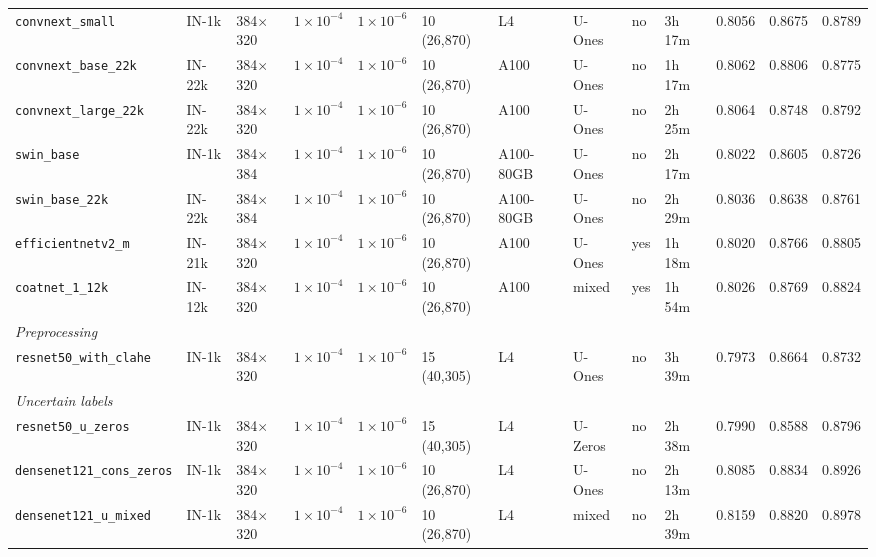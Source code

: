\begin{landscape}
\begin{longtable}{llllllllllrrr}
    \texttt{\scriptsize convnext\_small} & IN-1k & 384$\times$320 & $1\times10^{-4}$ & $1\times10^{-6}$ & 10 (26,870) & L4 & U-Ones & no & 3h\,17m & 0.8056 & 0.8675 & 0.8789 \\
    \texttt{\scriptsize convnext\_base\_22k} & IN-22k & 384$\times$320 & $1\times10^{-4}$ & $1\times10^{-6}$ & 10 (26,870) & A100 & U-Ones & no & 1h\,17m & 0.8062 & 0.8806 & 0.8775 \\
    \texttt{\scriptsize convnext\_large\_22k} & IN-22k & 384$\times$320 & $1\times10^{-4}$ & $1\times10^{-6}$ & 10 (26,870) & A100 & U-Ones & no & 2h\,25m & 0.8064 & 0.8748 & 0.8792 \\
    \texttt{\scriptsize swin\_base} & IN-1k & 384$\times$384 & $1\times10^{-4}$ & $1\times10^{-6}$ & 10 (26,870) & A100-80GB & U-Ones & no & 2h\,17m & 0.8022 & 0.8605 & 0.8726 \\
    \texttt{\scriptsize swin\_base\_22k} & IN-22k & 384$\times$384 & $1\times10^{-4}$ & $1\times10^{-6}$ & 10 (26,870) & A100-80GB & U-Ones & no & 2h\,29m & 0.8036 & 0.8638 & 0.8761 \\
    \texttt{\scriptsize efficientnetv2\_m} & IN-21k & 384$\times$320 & $1\times10^{-4}$ & $1\times10^{-6}$ & 10 (26,870) & A100 & U-Ones & yes & 1h\,18m & 0.8020 & 0.8766 & 0.8805 \\
    \texttt{\scriptsize coatnet\_1\_12k} & IN-12k & 384$\times$320 & $1\times10^{-4}$ & $1\times10^{-6}$ & 10 (26,870) & A100 & mixed & yes & 1h\,54m & 0.8026 & 0.8769 & 0.8824 \\
    \midrule
    \multicolumn{13}{l}{\textit{Preprocessing}} \\
    \texttt{\scriptsize resnet50\_with\_clahe} & IN-1k & 384$\times$320 & $1\times10^{-4}$ & $1\times10^{-6}$ & 15 (40,305) & L4 & U-Ones & no & 3h\,39m & 0.7973 & 0.8664 & 0.8732 \\
    \midrule
    \multicolumn{13}{l}{\textit{Uncertain labels}} \\
    \texttt{\scriptsize resnet50\_u\_zeros} & IN-1k & 384$\times$320 & $1\times10^{-4}$ & $1\times10^{-6}$ & 15 (40,305) & L4 & U-Zeros & no & 2h\,38m & 0.7990 & 0.8588 & 0.8796 \\
    \texttt{\scriptsize densenet121\_cons\_zeros} & IN-1k & 384$\times$320 & $1\times10^{-4}$ & $1\times10^{-6}$ & 10 (26,870) & L4 & U-Ones & no & 2h\,13m & 0.8085 & 0.8834 & 0.8926 \\
    \texttt{\scriptsize densenet121\_u\_mixed} & IN-1k & 384$\times$320 & $1\times10^{-4}$ & $1\times10^{-6}$ & 10 (26,870) & L4 & mixed & no & 2h\,39m & 0.8159 & 0.8820 & 0.8978 \\

\end{longtable}
\end{landscape}

